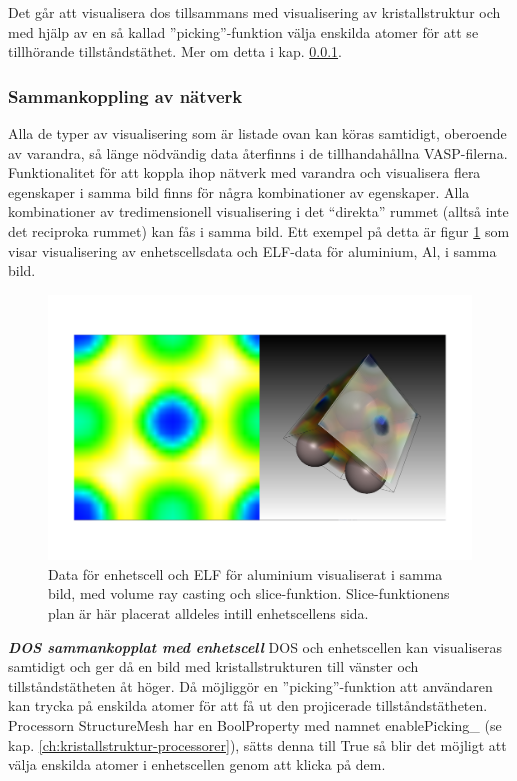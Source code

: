 \documentclass[a4paper,12pt]{article}
\begin{document}
Det går att visualisera dos tillsammans med visualisering av kristallstruktur och med hjälp av en så kallad ''picking''-funktion välja enskilda atomer för att se tillhörande tillståndstäthet. Mer om detta i kap. \ref{ch:sammankoppling}.

\subsubsection{Sammankoppling av nätverk}
\label{ch:sammankoppling}
Alla de typer av visualisering som är listade ovan kan köras samtidigt, oberoende av varandra, så länge nödvändig data återfinns i de tillhandahållna VASP-filerna. Funktionalitet för att koppla ihop nätverk med varandra och visualisera flera egenskaper i samma bild finns för några kombinationer av egenskaper. Alla kombinationer av tredimensionell visualisering i det ``direkta'' rummet (alltså inte det reciproka rummet) kan fås i samma bild. Ett exempel på detta är figur \ref{fig:sammankoppling} som visar visualisering av enhetscellsdata och ELF-data för aluminium, Al, i samma bild.

\begin{figure} [H]
\centering
\includegraphics[scale=0.25]{screenshot_sammankoppling_Al.png}
\caption{Data för enhetscell och ELF för aluminium visualiserat i samma bild, med volume ray casting och slice-funktion. Slice-funktionens plan är här placerat alldeles intill enhetscellens sida.}
\label{fig:sammankoppling}
\end{figure}

\textbf{\textit{DOS sammankopplat med enhetscell}}\newline
DOS och enhetscellen kan visualiseras samtidigt och ger då en bild med kristallstrukturen till vänster och tillståndstätheten åt höger. Då möjliggör en ''picking''-funktion att användaren kan trycka på enskilda atomer för att få ut den projicerade tillståndstätheten. Processorn StructureMesh har en BoolProperty med namnet enablePicking\_ (se kap. \ref{ch:kristallstruktur-processorer}), sätts denna till True så blir det möjligt att välja enskilda atomer i enhetscellen genom att klicka på dem. 
\end{document}

